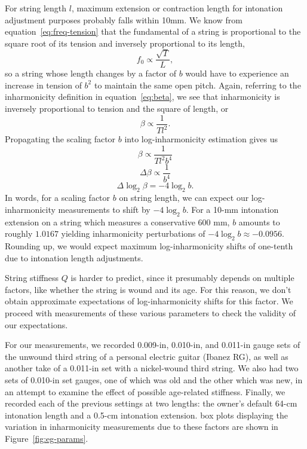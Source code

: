 \documentclass[12pt]{cmuthesis}
\begin{document}
For string length $l$, maximum extension or contraction length for intonation adjustment purposes probably falls within 10mm. We know from equation~\eqref{eq:freq-tension} that the fundamental of a string is proportional to the square root of its tension and inversely proportional to its length,
\begin{equation}
f_0 \propto \frac{\sqrt{T}}{L},
\end{equation}
so a string whose length changes by a factor of $b$ would have to experience an increase in tension of $b^2$ to maintain the same open pitch. Again, referring to the inharmonicity definition in equation~\eqref{eq:beta}, we see that inharmonicity is inversely proportional to tension and the square of length, or
\begin{equation}
\beta \propto \frac{1}{Tl^2}.
\end{equation}
Propagating the scaling factor $b$ into log-inharmonicity estimation gives us
\begin{equation}
\beta \propto \frac{1}{Tl^2b^4}
\end{equation}
\begin{equation}
\Delta\beta \propto \frac{1}{b^4}
\end{equation}
\begin{equation}
\Delta\log_2\beta = -4\log_2b.
\end{equation}
In words, for a scaling factor $b$ on string length, we can expect our log-inharmonicity measurements to shift by $-4\log_2b$. For a 10-mm intonation extension on a string which measures a conservative 600 mm, $b$ amounts to roughly $1.0167$ yielding inharmonicity perturbations of $-4\log_2b \approx -0.0956$. Rounding up, we would expect maximum log-inharmonicity shifts of one-tenth due to intonation length adjustments.

String stiffness $Q$ is harder to predict, since it presumably depends on multiple factors, like whether the string is wound and its age. For this reason, we don't obtain approximate expectations of log-inharmonicity shifts for this factor. We proceed with measurements of these various parameters to check the validity of our expectations.

For our measurements, we recorded 0.009-in, 0.010-in, and 0.011-in gauge sets of the unwound third string of a personal electric guitar (Ibanez RG), as well as another take of a 0.011-in set with a nickel-wound third string. We also had two sets of 0.010-in set gauges, one of which was old and the other which was new, in an attempt to examine the effect of possible age-related stiffness. Finally, we recorded each of the previous settings at two lengths: the owner's default 64-cm intonation length and a 0.5-cm intonation extension. box plots displaying the variation in inharmonicity measurements due to these factors are shown in Figure~\ref{fig:eg-params}.
\end{document}
